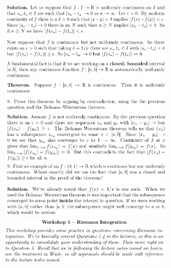 \documentclass[8pt,landscape]{article}
\begin{document}
\begin{multicols}{3}
    \includegraphics[width=270]{026.png} \\
    \includegraphics[width=270]{027.png} \\
    \includegraphics[width=270]{028.png} \\
    \includegraphics[width=270]{029.png} \\
    \includegraphics[width=270]{030.png} \\
    \includegraphics[width=270]{031.png} \\
    \includegraphics[width=270]{032.png} \\

\end{multicols}
\end{document}
